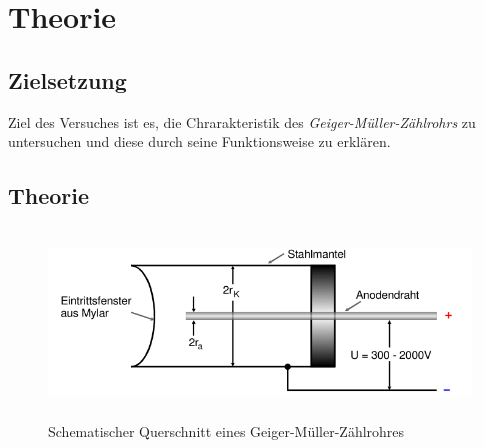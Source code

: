 \section{Theorie}
\label{sec:Theorie}
\subsection{Zielsetzung}
Ziel des Versuches ist es, die Chrarakteristik des \textit{Geiger-Müller-Zählrohrs} zu untersuchen und diese durch seine Funktionsweise zu erklären.

\subsection{Theorie}
\begin{figure}
  \centering
  \includegraphics[height=5cm]{./logos/GM.PNG}
  \caption{Schematischer Querschnitt eines Geiger-Müller-Zählrohres \cite{Anleitung}}
  \label{fig:GM}
\end{figure}

